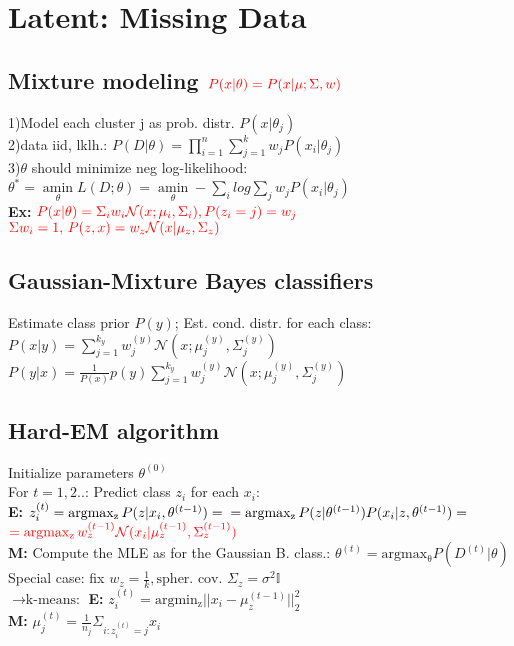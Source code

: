 \section*{Latent: Missing Data }
\subsection*{Mixture modeling $\color{red} P(x|\theta)=P(x|\mu;\Sigma,w)$}
1)Model each cluster j as prob. distr. $P(x|\theta_j)$\\
2)data iid, lklh.: $P(D|\theta) = \prod_{i=1}^n \sum_{j=1}^k w_j P(x_i|\theta_j)$\\
3)$\theta$ should minimize neg log-likelihood:\\ $\theta^*=\underset{\theta}{\operatorname{amin}}L(D;\theta) = \underset{\theta}{\operatorname{amin}} - \sum_i log \sum_j w_j P(x_i| \theta_j)$\\
\textbf{Ex:} $\color{red} P(x|\theta)=\Sigma_iw_i\mathcal{N}(x;\mu_i,\Sigma_i), P(z_i=j)=w_j$\\
$\color{red} \Sigma w_i=1,\, P(z,x)=w_z\mathcal{N}(x|\mu_z,\Sigma_z)$

\subsection*{Gaussian-Mixture Bayes classifiers}
Estimate class prior $P(y)$; Est. cond. distr. for each class:
$P(x|y) = \sum_{j=1}^{k_y} w_j^{(y)} \mathcal{N}(x; \mu_j^{(y)}, \Sigma_j^{(y)})$\\
$P(y|x) = \frac{1}{P(x)} p(y) \sum_{j=1}^{k_y} w_j^{(y)} \mathcal{N}(x; \mu_j^{(y)}, \Sigma_j^{(y)})$

\subsection*{Hard-EM algorithm}
Initialize parameters $\theta^{(0)}$\\
For $t=1,2..$:
Predict class $z_i$ for each $x_i$:\\
\textbf{E: }$z_i^{(t)} = \operatorname{argmax_z} P(z|x_i, \theta^{(t-1)})=\\
= \operatorname{argmax_z} P(z|\theta^{(t-1)}) P(x_i|z,\theta^{(t-1)})=$\\
$\color{red} =\operatorname{argmax_z} w_z^{(t-1)}\mathcal{N}(x_i|\mu_z^{(t-1)},\Sigma_z^{(t-1)})$\\
\textbf{M: }Compute the MLE as for the Gaussian B. class.:
$\theta^{(t)} = \operatorname{argmax_\theta} P(D^{(t)}|\theta)$\\
Special case: fix $w_z=\frac{1}{k}, \text{spher. cov. } \Sigma_z=\sigma^2\mathbb{I}$\\
$\rightarrow \text{k-means:}$ \textbf{E: } $z_i^{(t)}=\operatorname{argmin_z}||x_i-\mu_z^{(t-1)}||_2^2$\\
\textbf{M: }$\mu_j^{(t)}=\frac{1}{n_j}\Sigma _{i:z_i^{(t)}=j} x_i$
\iffalse
$\text{; Soft-EM:as }\sigma \rightarrow 0,\\ \gamma_i(x_i) \rightarrow \{0,1\} \text{ determ.}$
\fi

